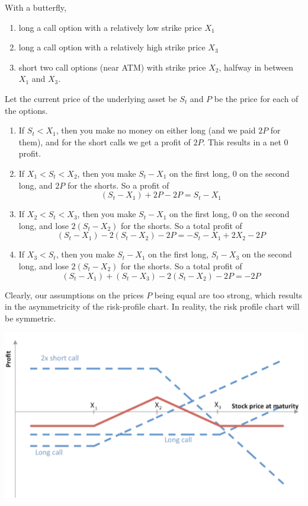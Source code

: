 \documentclass{article}
\begin{document}
\begin{definition}
With a butterfly, 
\begin{enumerate}
    \item long a call option with a relatively low strike price $X_1$ 
    \item long a call option with a relatively high strike price $X_3$ 
    \item short two call options (near ATM) with strike price $X_2$, halfway in between $X_1$ and $X_3$. 
\end{enumerate}
Let the current price of the underlying asset be $S_t$ and $P$ be the price for each of the options. 
\begin{enumerate}
    \item If $S_t < X_1$, then you make no money on either long (and we paid $2P$ for them), and for the short calls we get a profit of $2P$. This results in a net $0$ profit. 
    \item If $X_1 < S_t < X_2$, then you make $S_t - X_1$ on the first long, $0$ on the second long, and $2P$ for the shorts. So a profit of 
    \[(S_t - X_1) + 2P - 2P = S_t - X_1 \]
    \item If $X_2 < S_t < X_3$, then you make $S_t - X_1$ on the first long, $0$ on the second long, and lose $2 (S_t - X_2)$ for the shorts. So a total profit of 
    \[(S_t - X_1) - 2 (S_t - X_2) - 2P = - S_t - X_1 + 2X_2 - 2P\]
    \item If $X_3 < S_t$, then you make $S_t - X_1$ on the first long, $S_t - X_3$ on the second long, and lose $2 (S_t - X_2)$ for the shorts. So a total profit of  
    \[(S_t - X_1) + (S_t - X_3) - 2 (S_t - X_2) - 2P = -2P\]
\end{enumerate}
Clearly, our assumptions on the prices $P$ being equal are too strong, which results in the asymmetricity of the risk-profile chart. In reality, the risk profile chart will be symmetric. 
\begin{center}
    \includegraphics[scale=0.5]{img/butterfly_long.png}
\end{center}
\end{definition}
\end{document}
